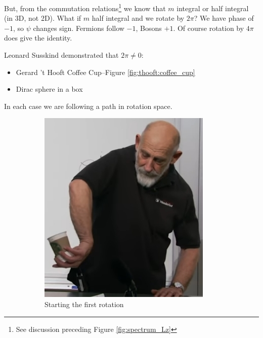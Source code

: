 \documentclass[]{article}
\begin{document}
But, from the commutation relations\footnote{See discussion preceding Figure \ref{fig:spectrum_Lz}} we know that  $m$ integral or half integral (in 3D, not 2D).
What if $m$ half integral and we rotate by $2\pi$? We have phase of $-1$, so $\psi$ changes sign. Fermions follow $-1$, Bosons $+1$. Of course rotation by  $4\pi$ does give the identity.

Leonard Susskind demonstrated that $2\pi\ne0$:
\begin{itemize}
	\item Gerard 't Hooft Coffee Cup--Figure \ref{fig:thooft:coffee_cup} 
	\item Dirac sphere in a box
\end{itemize}
In each case we are following a path in rotation space.

\begin{figure}[H]
	\caption{The Gerard 't Hooft Coffee Cup trick}\label{fig:thooft:coffee_cup}
	\begin{subfigure}{0.45\textwidth}
		\caption{Starting the first rotation}
		\includegraphics[width=\textwidth]{aqm-5-coffee-cup1}
	\end{subfigure}
	\begin{subfigure}{0.45\textwidth}

\end{subfigure}
\end{figure}
\end{document}

